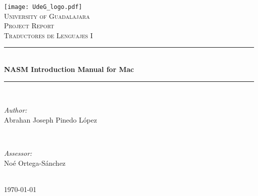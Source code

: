 \begin{titlepage}
	\centering
	\texttt{[image: UdeG\_logo.pdf]} \\ [1 cm]	%
	\textsc{\LARGE University of Guadalajara}\\[2.0 cm]	%
	\textsc{\Large Project Report}\\[0.5 cm]
	\textsc{\large Traductores de Lenguajes I}\\[0.5 cm] %

	\rule{\linewidth}{0.2 mm} \\[0.4 cm]
	{\huge\bfseries NASM Introduction Manual for Mac} \\
	\rule{\linewidth}{0.2 mm} \\[1.5 cm]

	\begin{minipage}{0.45\textwidth}
		\begin{flushleft} \large
			\emph{Author:}\\
			Abrahan Joseph Pinedo López
			\end{flushleft}
	\end{minipage}~
	\begin{minipage}{0.45\textwidth}
			\begin{flushright} \large
			\emph{Assessor:} \\
			Noé Ortega-Sánchez
		\end{flushright}
	\end{minipage}\\[2 cm]
	
	{\large \mydate\today}\\[2 cm]
 
 	\vfill
\end{titlepage}

\thispagestyle{empty}
\setcounter{page}{4}
\restoregeometry